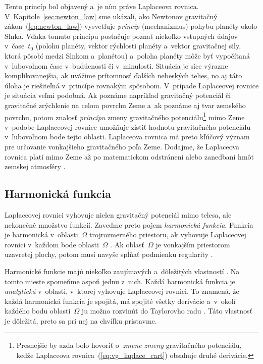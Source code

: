 \documentclass[a4paper, 12pt]{book}
\begin{document}
Tento princíp bol objavený a~je ním práve Laplaceova rovnica.  
V~Kapitole~\ref{sec:newton_law} sme ukázali, ako Newtonov gravitačný 
zákon~(\ref{eq:newton_law}) vysvetľuje \emph{princíp} (mechanizmus) pohybu 
planéty okolo Slnka.  Vďaka tomuto princípu postačuje poznať niekoľko vstupných 
údajov v~čase~$t_0$ (polohu planéty, vektor rýchlosti planéty a~vektor 
gravitačnej sily, ktorá pôsobí medzi Slnkom a~planétou) a~poloha planéty môže 
byť vypočítaná v~ľubovoľnom čase v~budúcnosti či v~minulosti.  Situácia je síce 
výrazne komplikovanejšia, ak uvážime prítomnosť ďalších nebeských telies, no aj 
táto úloha je riešiteľná v~princípe rovnakým spôsobom.  V~prípade Laplaceovej 
rovnice je situácia veľmi podobná.  Ak poznáme napríklad gravitačný potenciál 
či gravitačné zrýchlenie na celom povrchu Zeme a~ak poznáme aj tvar zemského 
povrchu, potom znalosť \emph{princípu} zmeny gravitačného 
potenciálu\footnote{Presnejšie by azda bolo hovoriť o~\textit{zmene zmeny} 
gravitačného potenciálu, keďže Laplaceova rovnica~(\ref{eq:vg_laplace_cart}) 
obsahuje druhé derivácie.} mimo Zeme v~podobe Laplaceovej rovnice umožňuje 
zistiť hodnotu gravitačného potenciálu v~ľubovoľnom bode tejto oblasti.  
Laplaceova rovnica má preto kľúčový význam pre určovanie vonkajšieho 
gravitačného poľa Zeme.  Dodajme, že Laplaceova rovnica platí mimo Zeme až po 
matematickom odstránení alebo zanedbaní hmôt zemskej atmosféry \parencite[pozri 
napríklad][]{Janak2006}.



\subsection{Harmonická funkcia}
\label{sec:harmonic_function}

Laplaceovej rovnici vyhovuje nielen gravitačný potenciál mimo telesa, ale
nekonečné množstvo funkcií.  Zaveďme preto pojem \emph{harmonická funkcia}.
Funkcia je harmonická v~oblasti~$\Omega$ trojrozmerného priestoru, ak vyhovuje 
Laplaceovej rovnici v~každom bode oblasti~$\Omega$ 
\parencite{MoritzPhysicalGeodesy}.  Ak oblasť~$\Omega$ je vonkajším priestorom 
uzavretej plochy, potom musí navyše spĺňať podmienku regularity 
\parencite[pozri 
nerovnosti~\ref{eq:regular_function};][]{MoritzPhysicalGeodesy}.

Harmonické funkcie majú niekoľko zaujímavých a~dôležitých vlastností 
\parencite[pozri napríklad][]{Kellogg1967,Pick1973,Janak2006}.  Na tomto mieste 
spomeňme aspoň jednu z~nich.  Každá harmonická funkcia je \emph{analytická} 
v~oblasti, v~ktorej vyhovuje Laplaceovej rovnici.  To znamená, že každá 
harmonická funkcia je spojitá, má spojité všetky derivácie a~v~okolí každého 
bodu oblasti~$\Omega$ ju možno rozvinúť do Taylorovho radu 
\parencite{MoritzPhysicalGeodesy}.  Táto vlastnosť je dôležitá, preto sa pri 
nej na chvíľku pristavme.
\end{document}
